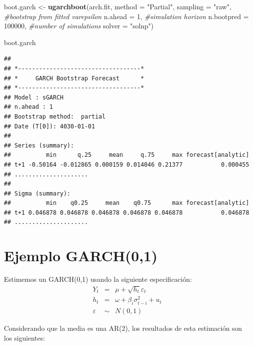 \documentclass[
]{book}
\newenvironment{Shaded}{\begin{snugshade}}{\end{snugshade}}
\newcommand{\AttributeTok}[1]{\textcolor[rgb]{0.13,0.29,0.53}{#1}}
\newcommand{\CommentTok}[1]{\textcolor[rgb]{0.56,0.35,0.01}{\textit{#1}}}
\newcommand{\DecValTok}[1]{\textcolor[rgb]{0.00,0.00,0.81}{#1}}
\newcommand{\FunctionTok}[1]{\textcolor[rgb]{0.13,0.29,0.53}{\textbf{#1}}}
\newcommand{\NormalTok}[1]{#1}
\newcommand{\OtherTok}[1]{\textcolor[rgb]{0.56,0.35,0.01}{#1}}
\newcommand{\StringTok}[1]{\textcolor[rgb]{0.31,0.60,0.02}{#1}}
\begin{document}
\begin{Shaded}
\begin{Highlighting}[]
\NormalTok{boot.garch }\OtherTok{\textless{}{-}} \FunctionTok{ugarchboot}\NormalTok{(arch.fit,}
                         \AttributeTok{method =} \StringTok{"Partial"}\NormalTok{,}
                         \AttributeTok{sampling =} \StringTok{"raw"}\NormalTok{,  }\CommentTok{\#bootstrap from fitted varepsilon}
                         \AttributeTok{n.ahead =} \DecValTok{1}\NormalTok{,          }\CommentTok{\#simulation horizon}
                         \AttributeTok{n.bootpred =} \DecValTok{100000}\NormalTok{, }\CommentTok{\#number of simulations }
                         \AttributeTok{solver =} \StringTok{"solnp"}\NormalTok{)}

\NormalTok{boot.garch}
\end{Highlighting}
\end{Shaded}

\begin{verbatim}
## 
## *-----------------------------------*
## *     GARCH Bootstrap Forecast      *
## *-----------------------------------*
## Model : sGARCH
## n.ahead : 1
## Bootstrap method:  partial
## Date (T[0]): 4030-01-01
## 
## Series (summary):
##          min      q.25     mean     q.75     max forecast[analytic]
## t+1 -0.50164 -0.012865 0.000159 0.014046 0.21377           0.000455
## .....................
## 
## Sigma (summary):
##          min    q0.25     mean    q0.75      max forecast[analytic]
## t+1 0.046878 0.046878 0.046878 0.046878 0.046878           0.046878
## .....................
\end{verbatim}

\hypertarget{ejemplo-garch01}{%
\section{Ejemplo GARCH(0,1)}\label{ejemplo-garch01}}

Estimemos un GARCH(0,1) usando la siguiente especificación:
\begin{eqnarray*}
Y_t & = & \mu+\sqrt{h_t}\varepsilon_t \\
    h_t & = & \omega+\beta_i \sigma^2_{t-i}+u_t \\
    \varepsilon & \sim & N(0,1) 
\end{eqnarray*}

Considerando que la media es una AR(2), los resultados de esta estimación son los siguientes:
\end{document}
